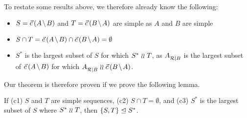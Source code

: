 To restate some results above, we therefore already know the following:
\begin{itemize}
\item $S=\amb$ and $T=\bma$ are simple as $A$ and $B$ are simple
\item $S\cap T = \amb \cap \bma = \emptyset$
\item $S^*$ is the largest subset of $S$ for which $S^*\mathrel{\wr\wr} T$, as
${A}^{}_{\mathcal{R}|{B}}$ is the largest subset of $\amb$ for which $\reca\indep\bma$.
\end{itemize}
Our theorem is therefore proven if we prove the following lemma.
\newcommand{\condSimple}{(c1)}
\newcommand{\condDisj}{(c2)}
\newcommand{\condApr}{(c3)}
\begin{mylem}
If
{\rm\condSimple} $S$ and $T$ are simple sequences,
{\rm\condDisj} $S\cap T=\emptyset$,
and {\rm\condApr} $S^*$ is the largest subset of $S$ where $S^*\mathrel{\wr\wr} T$,
then
${\{{S,T}\}}\trianglelefteq{S^*}$.
\end{mylem}
